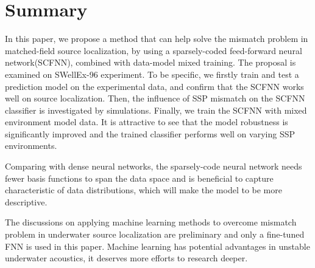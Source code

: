 \section{Summary}
In this paper, we propose a method that can help solve the mismatch problem in matched-field source localization,
by using a sparsely-coded feed-forward neural network(SCFNN), combined with data-model mixed training.
The proposal is examined on SWellEx-96 experiment.
To be specific, we firstly train and test a prediction model on the experimental data,
and confirm that the SCFNN works well on source localization.
Then, the influence of SSP mismatch on the SCFNN classifier is investigated by simulations. Finally, we train the SCFNN with mixed environment model data.
It is attractive to see that the model robustness is significantly improved and the trained classifier performs well on varying SSP environments.

Comparing with dense neural networks, the sparsely-code neural network needs fewer basis functions to span the data space and
is beneficial to capture characteristic of data distributions, which will make the model to be more descriptive.

The discussions on applying machine learning methods to overcome mismatch problem in underwater source localization are preliminary and only a fine-tuned FNN is used in this paper. Machine learning has potential advantages in unstable underwater acoustics, it deserves more efforts to research deeper.

